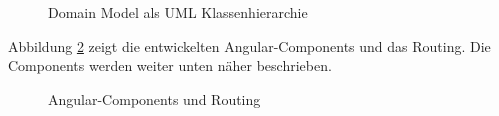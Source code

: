 \begin{figure}
\centering
{}
\caption{Domain Model als UML Klassenhierarchie}
\label{fig:domModel}
\end{figure}

Abbildung \ref{fig:routing} zeigt die entwickelten Angular-Components und das Routing. Die Components werden weiter unten näher beschrieben.

\begin{figure}
\centering
{}
\caption{Angular-Components und Routing}
\label{fig:routing}
\end{figure}


